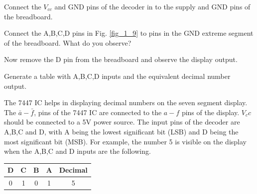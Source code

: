 \begin{problem}
	Connect the $V_{cc}$ and GND pins of the decoder in to the  supply and GND pins of the breadboard.
\end{problem}
\begin{problem}
	Connect the A,B,C,D pins in Fig. \ref{fig_1_9}  to pins in the GND extreme segment of the breadboard.  What do you observe?
\end{problem}
\begin{problem}
	Now remove the D pin from the breadboard and observe the display output.
\end{problem}
\begin{problem}
	Generate a table with A,B,C,D inputs and the equivalent decimal number output.
\end{problem}
The 7447 IC helps in displaying decimal numbers on the seven segment display.  The $\bar{a}-\bar{f}$, pins of the 7447 IC are connected to the $a-f$ pins of the display. $V_cc$ should be connected to a 5V power source. The input pins of the decoder are A,B,C and D, with A being the lowest significant bit (LSB) and D being the most significant bit (MSB).  For example, the number 5 is visible on the display when the A,B,C and D inputs are the following.
\begin{center}
	\begin{tabular}{|c|c|c|c|c|}
\hline
D & C & B & A & Decimal
\\ \hline
0 & 1 & 0 & 1 & 5
\\
\hline
\end{tabular}
\end{center}
